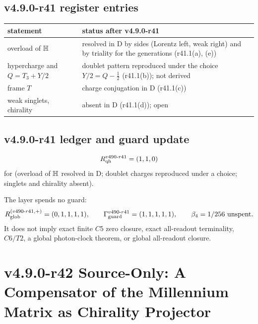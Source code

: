 \subsection*{v4.9.0-r41 register entries}
\label{subsec:v490-r41-register}

\begin{center}
\small
\begin{tabular}{@{}>{\raggedright\arraybackslash}p{}>{\raggedright\arraybackslash}p{}@{}}
\toprule
statement & status after v4.9.0-r41\\
\midrule
overload of \(\mathbb{H}\) & resolved in D by sides (Lorentz left, weak right) and by triality for the generations (r41.1(a), (e))\\
hypercharge and \(Q=T_3+Y/2\) & doublet pattern reproduced under the choice \(Y/2=Q-\tfrac12\) (r41.1(b)); not derived\\
frame \(T\) & charge conjugation in D (r41.1(c))\\
weak singlets, chirality & absent in D (r41.1(d)); open\\
\bottomrule
\end{tabular}
\end{center}

\subsection*{v4.9.0-r41 ledger and guard update}
\label{subsec:v490-r41-ledger-guard}

\[
R_{\rm qh}^{v490\text{-}r41}=(1,1,0)
\]
for (overload of \(\mathbb{H}\) resolved in D; doublet charges reproduced under a choice; singlets and chirality absent).

The layer spends no guard:
\[
R_{\rm glob}^{(v490\text{-}r41,+)}=(0,1,1,1,1),
\qquad
\Gamma_{\rm guard}^{v490\text{-}r41}=(1,1,1,1,1),
\qquad
\beta_4=1/256\ \text{unspent}.
\]
It does not imply exact finite \(C5\) zero closure, exact all-readout terminality,
\(C6/T2\), a global photon-clock theorem, or global all-readout closure.
\clearpage
\section*{v4.9.0-r42 Source-Only: A Compensator of the Millennium Matrix as Chirality Projector}
\label{sec:v490-r42-mm-compensator-chirality}

